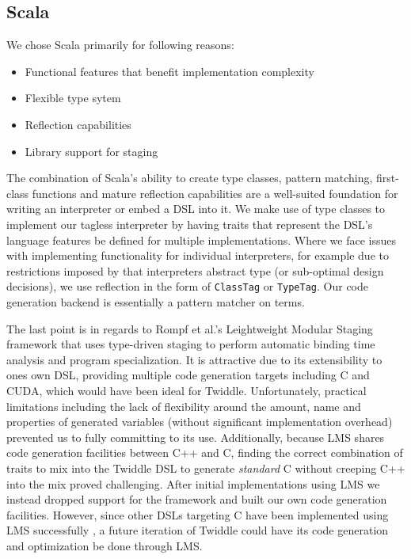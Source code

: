 \documentclass{article}
\begin{document}
\subsection{Scala}
We chose Scala primarily for following reasons:
\begin{itemize}
	\item Functional features that benefit implementation complexity
	\item Flexible type sytem
	\item Reflection capabilities
	\item Library support for staging
\end{itemize}

The combination of Scala's ability to create type classes, pattern matching, first-class functions and mature reflection capabilities are a well-suited foundation
for writing an interpreter or embed a DSL into it. We make use of type classes \cite{wadler1989make} to implement our tagless interpreter by having traits that represent
the DSL's language features be defined for multiple implementations. Where we face issues with implementing functionality for individual interpreters, for example due to restrictions imposed by
that interpreters abstract type (or sub-optimal design decisions), we use reflection in the form of \texttt{ClassTag} or \texttt{TypeTag}. Our code generation backend is essentially a
pattern matcher on terms.

The last point is in regards to Rompf et al.'s Leightweight Modular Staging framework \cite{rompf2010lightweight} that uses type-driven staging to perform automatic binding time analysis and
program specialization. It is attractive due to its extensibility to ones own DSL, providing multiple code generation targets including C and CUDA, which would have been ideal for Twiddle. Unfortunately, practical
limitations including the lack of flexibility around the amount, name and properties of generated variables (without significant implementation overhead) prevented us to fully committing to its use. Additionally, because LMS shares code generation
facilities between C++ and C, finding the correct combination of traits to mix into the Twiddle DSL to generate \textit{standard} C without creeping C++ into the mix proved challenging. After initial implementations using LMS
we instead dropped support for the framework and built our own code generation facilities. However, since other DSLs targeting C have been implemented using LMS successfully \cite{lee2011implementing, amin2017lms}, a future iteration of Twiddle could have its
code generation and optimization be done through LMS.
\end{document}
